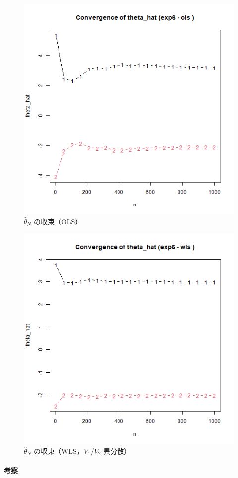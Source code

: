 \begin{figure}[H]
  \centering
  \includegraphics[width=.82\linewidth]{graphs/task6_ols.png}
  \caption{$\hat{\theta}_N$ の収束（OLS）}
  \label{fig:task6_ols}
\end{figure}

\begin{figure}[H]
  \centering
  \includegraphics[width=.82\linewidth]{graphs/task6_wls.png}
  \caption{$\hat{\theta}_N$ の収束（WLS，$V_1$/$V_2$ 異分散）}
  \label{fig:task6_wls}
\end{figure}

\paragraph{考察}
